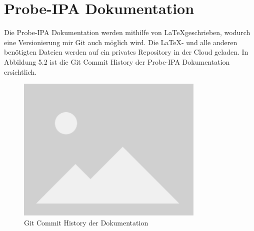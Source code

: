 \section{Probe-IPA Dokumentation}
Die Probe-IPA Dokumentation werden mithilfe von \LaTeX geschrieben, wodurch eine Versionierung mir Git auch möglich wird. Die \LaTeX- und alle anderen benötigten Dateien werden auf ein privates Repository in der Cloud geladen. In Abbildung 5.2 ist die Git Commit History der Probe-IPA Dokumentation ersichtlich.

\begin{figure}[H]
	\begin{center}
		\includegraphics[width=0.8\textwidth]{ressourcen/placeholder}
		\caption[Git Commit History der Dokumentation]{Git Commit History der Dokumentation}\label{fig:Git-Commit-History-der-Dokumentation}
	\end{center}
\end{figure}